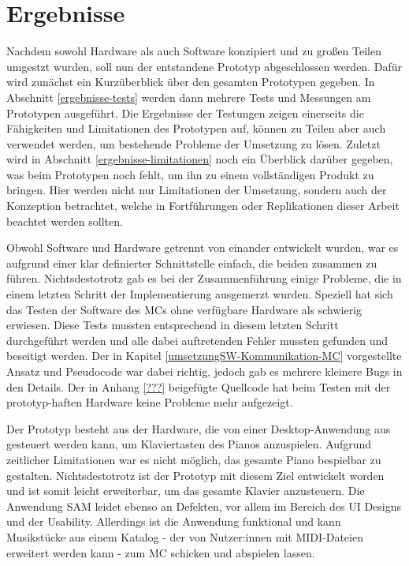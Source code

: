 

\chapter{Ergebnisse} \label{ergebnisse}
\nocite{*}

Nachdem sowohl Hardware als auch Software konzipiert und zu großen Teilen umgestzt wurden, soll nun der entstandene Prototyp abgeschlossen werden.
Dafür wird zunächst ein Kurzüberblick über den gesamten Prototypen gegeben.
In Abschnitt \ref{ergebnisse-tests} werden dann mehrere Tests und Messungen am Prototypen ausgeführt.
Die Ergebnisse der Testungen zeigen einerseits die Fähigkeiten und Limitationen des Prototypen auf, können zu Teilen aber auch verwendet werden, um bestehende Probleme der Umsetzung zu lösen.
Zuletzt wird in Abschnitt \ref{ergebnisse-limitationen} noch ein Überblick darüber gegeben, was beim Prototypen noch fehlt, um ihn zu einem vollständigen Produkt zu bringen. %
Hier werden nicht nur Limitationen der Umsetzung, sondern auch der Konzeption betrachtet, welche in Fortführungen oder Replikationen dieser Arbeit beachtet werden sollten.


Obwohl Software und Hardware getrennt von einander entwickelt wurden, war es aufgrund einer klar definierter Schnittstelle einfach, die beiden zusammen zu führen.
Nichtsdestotrotz gab es bei der Zusammenführung einige Probleme, die in einem letzten Schritt der Implementierung ausgemerzt wurden.
Speziell hat sich das Testen der Software des \ac{MC}s ohne verfügbare Hardware als schwierig erwiesen.
Diese Tests mussten entsprechend in diesem letzten Schritt durchgeführt werden und alle dabei auftretenden Fehler mussten gefunden und beseitigt werden.
Der in Kapitel \ref{umsetzungSW-Kommunikation-MC} vorgestellte Ansatz und Pseudocode war dabei richtig, jedoch gab es mehrere kleinere Bugs in den Details.
Der in Anhang \ref{???} beigefügte Quellcode hat beim Testen mit der prototyp-haften Hardware keine Probleme mehr aufgezeigt.

Der Prototyp besteht aus der Hardware, die von einer Desktop-Anwendung aus gesteuert werden kann, um Klaviertasten des Pianos anzuspielen.
Aufgrund zeitlicher Limitationen war es nicht möglich, das gesamte Piano bespielbar zu gestalten.
Nichtsdestotrotz ist der Prototyp mit diesem Ziel entwickelt worden und ist somit leicht erweiterbar, um das gesamte Klavier anzusteuern.
Die Anwendung \ac{SAM} leidet ebenso an Defekten, vor allem im Bereich des \ac{UI} Designs und der Usability.
Allerdings ist die Anwendung funktional und kann Musikstücke aus einem Katalog - der von Nutzer:innen mit \ac{MIDI}-Dateien erweitert werden kann - zum \ac{MC} schicken und abspielen lassen.




